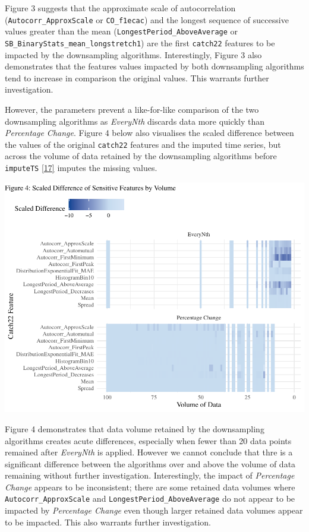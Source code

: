 \documentclass{article}
\begin{document}
Figure 3 suggests that the approximate scale of autocorrelation
(\texttt{Autocorr\_ApproxScale} or \texttt{CO\_f1ecac}) and the longest
sequence of successive values greater than the mean
(\texttt{LongestPeriod\_AboveAverage} or
\texttt{SB\_BinaryStats\_mean\_longstretch1}) are the first
\texttt{catch22} features to be impacted by the downsampling algorithms.
Interestingly, Figure 3 also demonstrates that the features values
impacted by both downsampling algorithms tend to increase in comparison
the original values. This warrants further investigation.

However, the parameters prevent a like-for-like comparison of the two
downsampling algorithms as \emph{EveryNth} discards data more quickly
than \emph{Percentage Change}. Figure 4 below also visualises the scaled
difference between the values of the original \texttt{catch22} features
and the imputed time series, but across the volume of data retained by
the downsampling algorithms before \texttt{imputeTS}
\protect\hyperlink{ref-imputeTS_R}{{[}17{]}} imputes the missing values.

\includegraphics{210431461_CSC8639_Dissertation_files/figure-latex/Heatmap_vol-1.pdf}

Figure 4 demonstrates that data volume retained by the downsampling
algorithms creates acute differences, especially when fewer than 20 data
points remained after \emph{EveryNth} is applied. However we cannot
conclude that thre is a significant difference between the algorithms
over and above the volume of data remaining without further
investigation. Interestingly, the impact of \emph{Percentage Change}
appears to be inconsistent; there are some retained data volumes where
\texttt{Autocorr\_ApproxScale} and \texttt{LongestPeriod\_AboveAverage}
do not appear to be impacted by \emph{Percentage Change} even though
larger retained data volumes appear to be impacted. This also warrants
further investigation.
\end{document}
